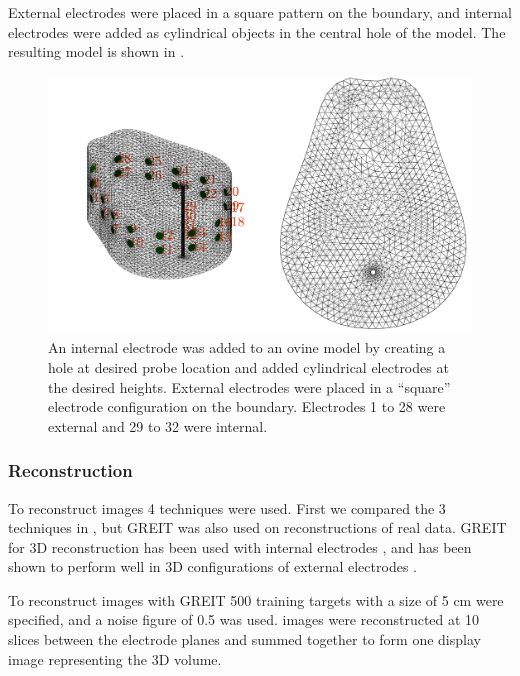 External electrodes were placed in a square pattern on the boundary, and internal
electrodes were added as cylindrical objects in the central hole of the model.
The resulting model is shown in .

\begin{figure}
    \centering
	\includegraphics[width=\textwidth]{chapter7-internal_elec_motion/imgs/lamb_model.pdf} 
	\caption[Ovine model with internal probe]{\label{fig:internal_lamb_model} 
	An internal electrode was added to an ovine model by creating a hole at desired probe
	location and added cylindrical electrodes at the desired heights. External electrodes
	were placed in a ``square'' electrode configuration on the boundary. Electrodes 1 to 28 were 
	external and 29 to 32 were internal.}
\end{figure}

\subsubsection{Reconstruction}
To reconstruct images 4 techniques were used. First we compared the 3
techniques in , but GREIT was also used on reconstructions 
of real data.
GREIT for 3D reconstruction has been used with internal electrodes 
\parencite{nasehi_tehrani_evaluation_2012,nasehi_tehrani_modelling_2012}, 
and has been shown to perform well in 3D configurations of external electrodes
\parencite{grychtol_3d_2016}.

To reconstruct images with GREIT 500 training targets with a size of 5 cm were specified, and a noise figure
of 0.5 was used.
images were reconstructed at 10 slices between the electrode planes and summed together to form one 
display image representing the 3D volume.


